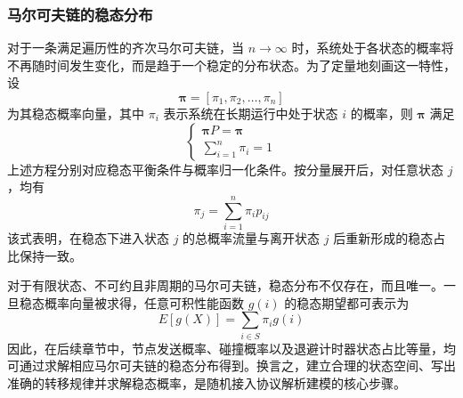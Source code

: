 \subsubsection{马尔可夫链的稳态分布}
对于一条满足遍历性的齐次马尔可夫链，当 $n \to \infty$ 时，系统处于各状态的概率将不再随时间发生变化，而是趋于一个稳定的分布状态。为了定量地刻画这一特性，设
\begin{equation}
    \boldsymbol{\pi} = [\pi_1,\pi_2,\dots,\pi_n]
\end{equation}
为其稳态概率向量，其中 $\pi_i$ 表示系统在长期运行中处于状态 $i$ 的概率，则 $\boldsymbol{\pi}$ 满足
\begin{equation}
    \begin{cases}
        \boldsymbol{\pi} P = \boldsymbol{\pi} \\
        \sum_{i=1}^{n} \pi_i = 1
    \end{cases}
\end{equation}
上述方程分别对应稳态平衡条件与概率归一化条件。按分量展开后，对任意状态 $j$，均有
\begin{equation}
    \pi_j=\sum_{i=1}^{n}\pi_i p_{ij}
\end{equation}
该式表明，在稳态下进入状态 $j$ 的总概率流量与离开状态 $j$ 后重新形成的稳态占比保持一致。

对于有限状态、不可约且非周期的马尔可夫链，稳态分布不仅存在，而且唯一。一旦稳态概率向量被求得，任意可积性能函数 $g(i)$ 的稳态期望都可表示为
\begin{equation}
    E[g(X)] = \sum_{i \in S}\pi_i g(i)
\end{equation}
因此，在后续章节中，节点发送概率、碰撞概率以及退避计时器状态占比等量，均可通过求解相应马尔可夫链的稳态分布得到。换言之，建立合理的状态空间、写出准确的转移规律并求解稳态概率，是随机接入协议解析建模的核心步骤。
